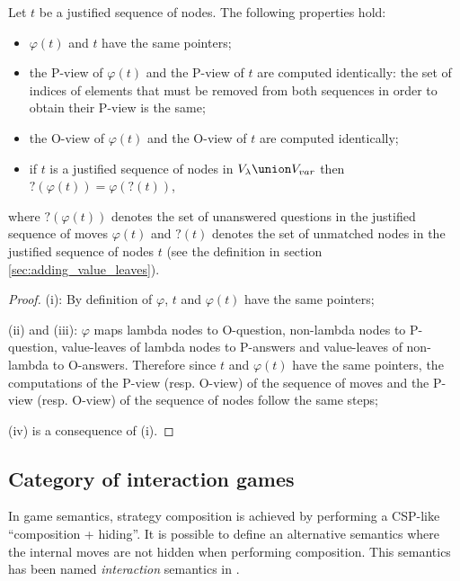 \begin{property}
\label{proper:phi_pview} Let $t$ be a justified sequence of nodes. The following properties hold:
\begin{itemize}
\item[(i)] $\varphi(t)$ and $t$ have the same pointers;
\item[(ii)] the P-view of $\varphi(t)$ and the P-view of $t$ are computed
identically: the set of indices of elements that must be removed
from both sequences in order to obtain their P-view is the same;
\item[(iii)] the O-view of $\varphi(t)$ and the O-view of $t$ are computed identically;
\item[(iv)] if $t$ is a justified sequence of nodes in $V_\lambda \union V_{var}$ then $?(\varphi(t)) =
\varphi(?(t))$,
\end{itemize}
where $?(\varphi(t))$ denotes the set of unanswered questions in the
justified sequence of moves $\varphi(t)$ and $?(t)$ denotes the set
of unmatched nodes in the justified sequence of nodes $t$ (see the
definition in section \ref{sec:adding_value_leaves}).
\end{property}
\begin{proof}
(i): By definition of $\varphi$, $t$ and $\varphi(t)$ have the same
pointers;

(ii) and (iii): $\varphi$ maps lambda nodes to O-question,
non-lambda nodes to P-question, value-leaves of lambda nodes to P-answers and
value-leaves of non-lambda to O-answers. Therefore since $t$ and $\varphi(t)$ have the
same pointers, the computations of the P-view (resp. O-view) of the
sequence of moves and the P-view (resp. O-view) of the sequence of
nodes follow the same steps;

(iv) is a consequence of (i).

\end{proof}


\subsection{Category of interaction games}
\label{sec:interaction_semantics}

In game semantics, strategy composition is achieved by performing a CSP-like ``composition + hiding''.
It is possible to define an alternative semantics where the internal moves are not hidden when performing composition.
This semantics has been named \emph{interaction} semantics in \cite{DBLP:conf/sas/DimovskiGL05}.

